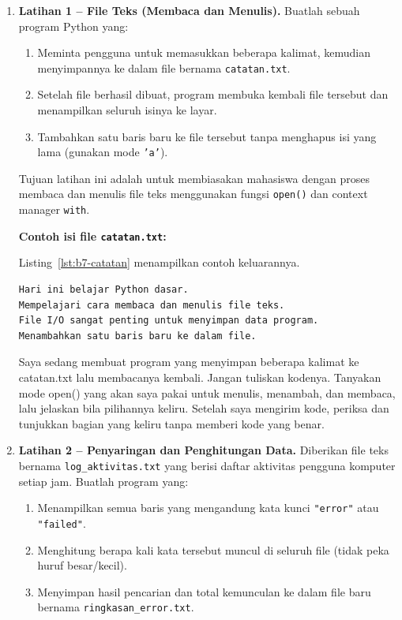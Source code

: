 \begin{enumerate}
    
\item \textbf{Latihan 1 – File Teks (Membaca dan Menulis).}  
Buatlah sebuah program Python yang:
\begin{enumerate}
    \item Meminta pengguna untuk memasukkan beberapa kalimat, kemudian menyimpannya ke dalam file bernama \texttt{catatan.txt}.  
    \item Setelah file berhasil dibuat, program membuka kembali file tersebut dan menampilkan seluruh isinya ke layar.  
    \item Tambahkan satu baris baru ke file tersebut tanpa menghapus isi yang lama (gunakan mode \texttt{'a'}).  
\end{enumerate}

Tujuan latihan ini adalah untuk membiasakan mahasiswa dengan proses membaca dan menulis file teks menggunakan fungsi \texttt{open()} dan context manager \texttt{with}.

\noindent\textbf{Contoh isi file \texttt{catatan.txt}:}

Listing~\ref{lst:b7-catatan} menampilkan contoh keluarannya.

\begin{lstlisting}[language=bash, caption={Isi file catatan.txt yang dihasilkan}, label={lst:b7-catatan}]
Hari ini belajar Python dasar.
Mempelajari cara membaca dan menulis file teks.
File I/O sangat penting untuk menyimpan data program.
Menambahkan satu baris baru ke dalam file.
\end{lstlisting}


  \begin{promptterarah}
  Saya sedang membuat program yang menyimpan beberapa kalimat ke catatan.txt lalu membacanya kembali. Jangan tuliskan kodenya. Tanyakan mode open() yang akan saya pakai untuk menulis, menambah, dan membaca, lalu jelaskan bila pilihannya keliru. Setelah saya mengirim kode, periksa dan tunjukkan bagian yang keliru tanpa memberi kode yang benar.
  \end{promptterarah}
\item \textbf{Latihan 2 – Penyaringan dan Penghitungan Data.}  
Diberikan file teks bernama \texttt{log\_aktivitas.txt} yang berisi daftar aktivitas pengguna komputer setiap jam.  
Buatlah program yang:
\begin{enumerate}
    \item Menampilkan semua baris yang mengandung kata kunci \texttt{"error"} atau \texttt{"failed"}.  
    \item Menghitung berapa kali kata tersebut muncul di seluruh file (tidak peka huruf besar/kecil).  
    \item Menyimpan hasil pencarian dan total kemunculan ke dalam file baru bernama \texttt{ringkasan\_error.txt}.  
\end{enumerate}


\end{enumerate}

